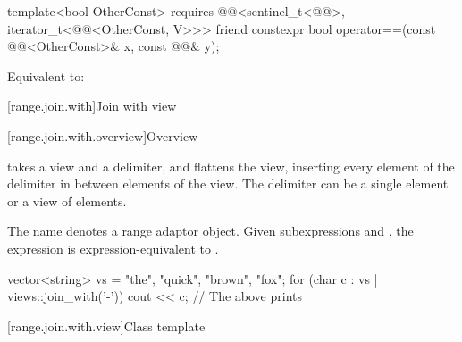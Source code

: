 \begin{itemdecl}
template<bool OtherConst>
  requires @@<sentinel_t<@@>, iterator_t<@@<OtherConst, V>>>
friend constexpr bool operator==(const @@<OtherConst>& x, const @@& y);
\end{itemdecl}

\begin{itemdescr}
\pnum
\effects
Equivalent to: 
\end{itemdescr}

[range.join.with]{Join with view}

[range.join.with.overview]{Overview}

\pnum
{} takes a view and a delimiter, and
flattens the view,
inserting every element of the delimiter
in between elements of the view.
The delimiter can be a single element or a view of elements.

\pnum
{}%
The name  denotes
a range adaptor object.
Given subexpressions  and ,
the expression  is expression-equivalent to
.

\pnum
\begin{example}
\begin{codeblock}
vector<string> vs = {"the", "quick", "brown", "fox"};
for (char c : vs | views::join_with('-')) {
  cout << c;
}
// The above prints 
\end{codeblock}
\end{example}

[range.join.with.view]{Class template }

